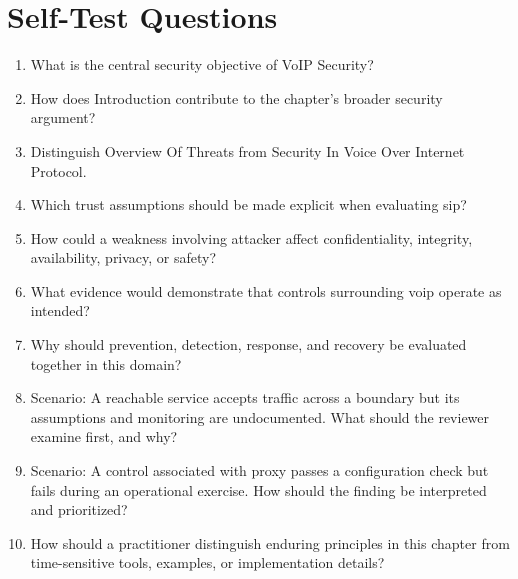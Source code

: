 \documentclass[11pt]{article}
\begin{document}
\section*{Self-Test Questions}
\begin{enumerate}
\item What is the central security objective of VoIP Security?
\item How does Introduction contribute to the chapter's broader security argument?
\item Distinguish Overview Of Threats from Security In Voice Over Internet Protocol.
\item Which trust assumptions should be made explicit when evaluating sip?
\item How could a weakness involving attacker affect confidentiality, integrity, availability, privacy, or safety?
\item What evidence would demonstrate that controls surrounding voip operate as intended?
\item Why should prevention, detection, response, and recovery be evaluated together in this domain?
\item Scenario: A reachable service accepts traffic across a boundary but its assumptions and monitoring are undocumented. What should the reviewer examine first, and why?
\item Scenario: A control associated with proxy passes a configuration check but fails during an operational exercise. How should the finding be interpreted and prioritized?
\item How should a practitioner distinguish enduring principles in this chapter from time-sensitive tools, examples, or implementation details?
\end{enumerate}
\end{document}
